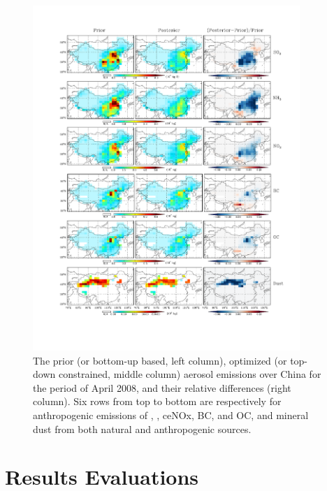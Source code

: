  \begin{figure}[t]
  \centering
  \includegraphics[width={0.90\textwidth}]{figures/a5.pdf}
  \caption{The prior (or bottom-up based, left column), optimized (or top-down constrained, middle column) aerosol emissions over China for the period of April 2008, and their relative differences (right column). Six rows from top to bottom are respectively for anthropogenic emissions of , , ce{NOx}, BC, and OC, and mineral dust from both natural and anthropogenic sources. }
  \label{fig:ems1}
 \end{figure}



\section{Results Evaluations} 

